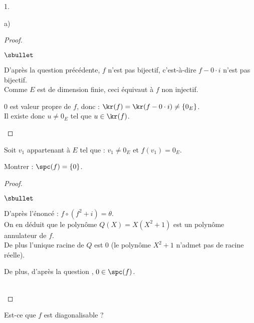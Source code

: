 \documentclass[11pt]{article}%
\begin{document}
\begin{noliste}{1.}
\begin{noliste}{a)}
  \begin{proof}~
   \begin{noliste}{$\sbullet$}
   \item D'après la question précédente, $f$ n'est pas bijectif,
     c'est-à-dire $f- 0 \cdot i$ n'est pas bijectif.\\ %
     Comme $E$ est de dimension finie, ceci équivaut à $f$ non injectif.%
    
  \item $0$ est valeur propre de $f$, donc : $\kr(f) = \kr(f - 0 \cdot
    i) \neq \{0_E\}$.\\[.1cm]
    Il existe donc $u \neq 0_E$ tel que $u \in \kr(f)$.%
    ~\\[-1.4cm]
   \end{noliste}
  \end{proof}
 \end{noliste}


\newpage


 \noindent
 Soit $v_1$ appartenant à $E$ tel que : $v_1\neq 0_E$ et $f(v_1)=0_E$.\\[-.8cm]
 \item Montrer : $\spc(f)=\{0\}$.
 
 \begin{proof}~
  \begin{noliste}{$\sbullet$}
  \item D'après l'énoncé : $f \circ (f^2+i) = \theta$.\\[.1cm]
    On en déduit que le polynôme $Q(X)=X(X^2+1)$ est un polynôme
    annulateur de $f$.\\
    De plus l'unique racine de $Q$ est $0$ (le polynôme $X^2+1$
    n'admet pas de racine réelle).%
   
  \item De plus, d'après la question , $0 \in \spc(f)$.
  \end{noliste}
  ~\\[-1cm]
 \end{proof}
 
\item Est-ce que $f$ est diagonalisable ?
 

\end{noliste}
\end{document}

